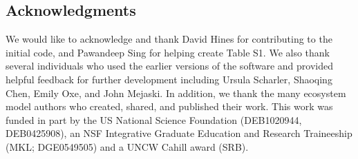 \documentclass[11pt]{article}
\newcommand{\enaR}{\texttt{enaR}}
\begin{document}
\begin{spacing}{2}



\section{Acknowledgments}
We would like to acknowledge and thank David Hines for contributing to
the initial code, and Pawandeep Sing for helping create Table S1.  We
also thank several individuals who used the earlier versions of the
software and provided helpful feedback for further development
including Ursula Scharler, Shaoqing Chen, Emily Oxe, and John Mejaski.
In addition, we thank the many ecosystem model authors who created,
shared, and published their work.  This work was funded in part by the
US National Science Foundation (DEB1020944, DEB0425908), an NSF
Integrative Graduate Education and Research Traineeship (MKL;
DGE0549505) and a UNCW Cahill award (SRB).

\end{spacing}
\end{document}
